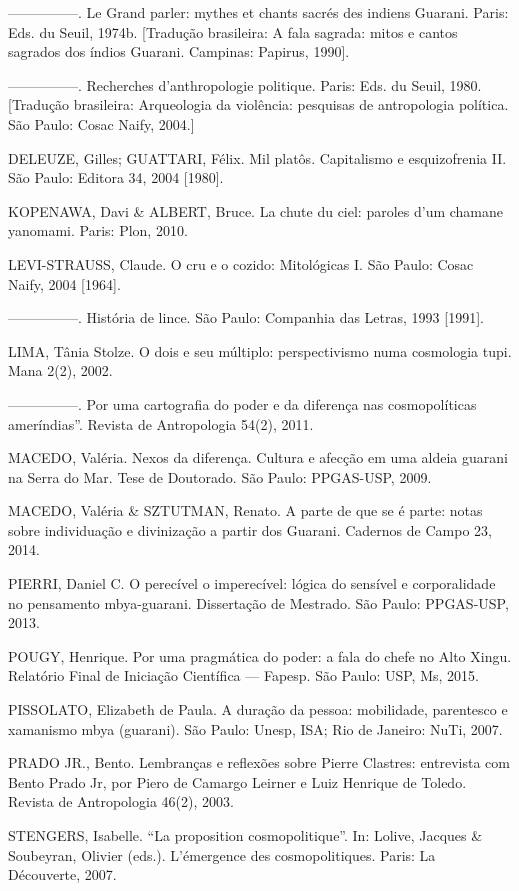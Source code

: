 —————. Le Grand parler: mythes et chants sacrés des indiens Guarani.
Paris: Eds. du Seuil, 1974b. [Tradução brasileira: A fala sagrada:
mitos e cantos sagrados dos índios Guarani. Campinas: Papirus, 1990]. 

—————. Recherches d’anthropologie politique. Paris: Eds. du Seuil, 1980.
[Tradução brasileira: Arqueologia da violência: pesquisas de
antropologia política. São Paulo: Cosac Naify, 2004.] 

DELEUZE, Gilles; GUATTARI, Félix. Mil platôs. Capitalismo e
esquizofrenia II. São Paulo: Editora 34, 2004 [1980].

KOPENAWA, Davi \& ALBERT, Bruce. La chute du ciel: paroles d’um chamane
yanomami. Paris: Plon, 2010.

LEVI-STRAUSS, Claude. O cru e o cozido: Mitológicas I. São Paulo: Cosac
Naify, 2004 [1964].

—————. História de lince. São Paulo: Companhia das Letras, 1993 [1991]. 

LIMA, Tânia Stolze. O dois e seu múltiplo: perspectivismo numa
cosmologia tupi. Mana 2(2), 2002.

—————. Por uma cartografia do poder e da diferença nas cosmopolíticas
ameríndias''. Revista de Antropologia 54(2), 2011. 

MACEDO, Valéria. Nexos da diferença. Cultura e afecção em uma aldeia
guarani na Serra do Mar. Tese de Doutorado. São Paulo: PPGAS-USP, 2009.

MACEDO, Valéria \& SZTUTMAN, Renato. A parte de que se é parte: notas
sobre individuação e divinização a partir dos Guarani. Cadernos de
Campo 23, 2014.

PIERRI, Daniel C. O perecível o imperecível: lógica do sensível e
corporalidade no pensamento mbya-guarani. Dissertação de Mestrado. São
Paulo: PPGAS-USP, 2013.

POUGY, Henrique. Por uma pragmática do poder: a fala do chefe no Alto
Xingu. Relatório Final de Iniciação Científica — Fapesp. São Paulo:
USP, Ms, 2015. 

PISSOLATO, Elizabeth de Paula. A duração da pessoa: mobilidade,
parentesco e xamanismo mbya (guarani). São Paulo: Unesp, ISA; Rio de
Janeiro: NuTi, 2007.

PRADO JR., Bento. Lembranças e reflexões sobre Pierre Clastres:
entrevista com Bento Prado Jr, por Piero de Camargo Leirner e Luiz
Henrique de Toledo. Revista de Antropologia 46(2), 2003.  

STENGERS, Isabelle. ``La proposition cosmopolitique''. In: Lolive, Jacques
\& Soubeyran, Olivier (eds.). L’émergence des cosmopolitiques. Paris:
La Découverte, 2007.


